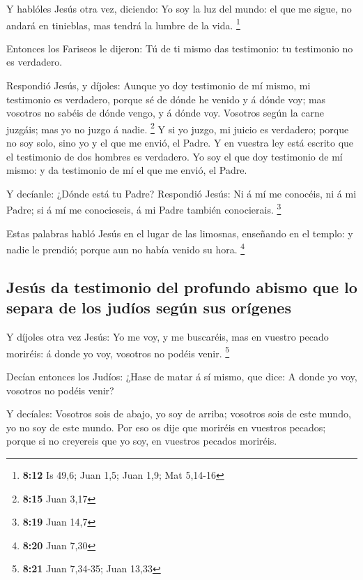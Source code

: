  Y hablóles Jesús otra vez, diciendo: Yo soy la luz del
mundo: el que me sigue, no andará en tinieblas, mas tendrá la lumbre de
la vida. \footnote{\textbf{8:12} Is 49,6; Juan 1,5; Juan 1,9; Mat
  5,14-16}

 Entonces los Fariseos le dijeron: Tú de ti mismo das
testimonio: tu testimonio no es verdadero.

 Respondió Jesús, y díjoles: Aunque yo doy testimonio de mí
mismo, mi testimonio es verdadero, porque sé de dónde he venido y á
dónde voy; mas vosotros no sabéis de dónde vengo, y á dónde voy.
 Vosotros según la carne juzgáis; mas yo no juzgo á nadie.
\footnote{\textbf{8:15} Juan 3,17}  Y si yo juzgo, mi
juicio es verdadero; porque no soy solo, sino yo y el que me envió, el
Padre.  Y en vuestra ley está escrito que el testimonio de
dos hombres es verdadero.  Yo soy el que doy testimonio de
mí mismo: y da testimonio de mí el que me envió, el Padre.

 Y decíanle: ¿Dónde está tu Padre? Respondió Jesús: Ni á mí
me conocéis, ni á mi Padre; si á mí me conocieseis, á mi Padre también
conocierais. \footnote{\textbf{8:19} Juan 14,7}

 Estas palabras habló Jesús en el lugar de las limosnas,
enseñando en el templo: y nadie le prendió; porque aun no había venido
su hora. \footnote{\textbf{8:20} Juan 7,30}

\hypertarget{jesuxfas-da-testimonio-del-profundo-abismo-que-lo-separa-de-los-juduxedos-seguxfan-sus-oruxedgenes}{%
\subsection{Jesús da testimonio del profundo abismo que lo separa de los
judíos según sus
orígenes}\label{jesuxfas-da-testimonio-del-profundo-abismo-que-lo-separa-de-los-juduxedos-seguxfan-sus-oruxedgenes}}

 Y díjoles otra vez Jesús: Yo me voy, y me buscaréis, mas
en vuestro pecado moriréis: á donde yo voy, vosotros no podéis venir.
\footnote{\textbf{8:21} Juan 7,34-35; Juan 13,33}

 Decían entonces los Judíos: ¿Hase de matar á sí mismo, que
dice: A donde yo voy, vosotros no podéis venir?

 Y decíales: Vosotros sois de abajo, yo soy de arriba;
vosotros sois de este mundo, yo no soy de este mundo.  Por
eso os dije que moriréis en vuestros pecados; porque si no creyereis que
yo soy, en vuestros pecados moriréis.

